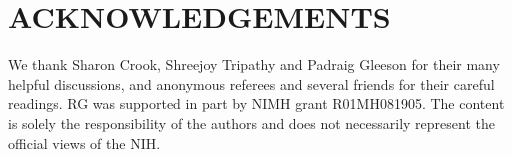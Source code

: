 \documentclass[9pt]{sig-alternate}
\begin{document}


\section{ACKNOWLEDGEMENTS}
We thank Sharon Crook, Shreejoy Tripathy and Padraig Gleeson for their many helpful discussions, and anonymous referees and several friends for their careful readings.  
RG was supported in part by NIMH grant R01MH081905. 
The content is solely the responsibility of the authors and does not necessarily represent the official views of the NIH.
\vspace{5px}


\end{document}

